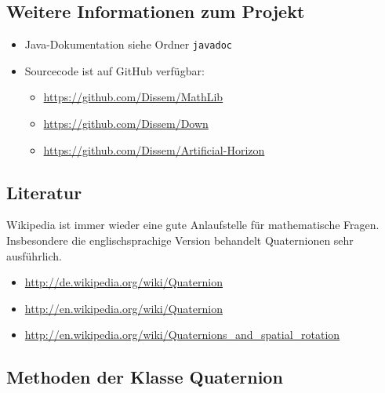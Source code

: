 \documentclass[12pt]{article}
\begin{document}
  \subsection{Weitere Informationen zum Projekt}

  \begin{itemize}
    \item Java-Dokumentation siehe Ordner \texttt{javadoc}
    \item Sourcecode ist auf GitHub verfügbar:
    \begin{itemize}
      \item \url{https://github.com/Dissem/MathLib}
      \item \url{https://github.com/Dissem/Down}
      \item \url{https://github.com/Dissem/Artificial-Horizon}
    \end{itemize}
  \end{itemize}


  \subsection{Literatur}

  Wikipedia ist immer wieder eine gute Anlaufstelle für mathematische Fragen. Insbesondere die englischsprachige Version behandelt Quaternionen sehr ausführlich.

  \begin{itemize}
    \item \url{http://de.wikipedia.org/wiki/Quaternion}
    \item \url{http://en.wikipedia.org/wiki/Quaternion}
    \item \url{http://en.wikipedia.org/wiki/Quaternions_and_spatial_rotation}
  \end{itemize}


  \subsection{Methoden der Klasse Quaternion}\label{methods}
\end{document}
